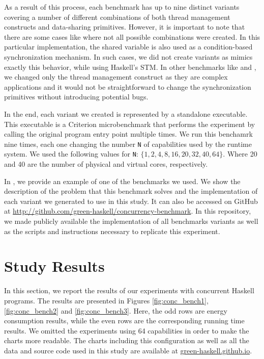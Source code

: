 As a result of this process, each benchmark has up to nine distinct variants covering a number of different combinations of both thread management constructs and data-sharing primitives. However, it is important to note that there are some cases like \dining where not all possible combinations were created. In this particular implementation, the shared variable is also used as a condition-based synchronization mechanism. In such cases, we did not create \TVar variants as \TMVar mimics exactly this behavior, while using Haskell's STM. In other benchmarks like \tsearch and \warp, we changed only the thread management construct as they are complex applications and it would not be straightforward to change the synchronization primitives without introducing potential bugs.

In the end, each variant we created is represented by a standalone executable. This executable is a Criterion microbenchmark that performs the experiment by calling the original program entry point multiple times. We run this benchamrk nine times, each one changing the number \texttt{N} of capabilities used by the runtime system. We used the following values for \texttt{N}: $\{1, 2, 4, 8, 16, 20, 32, 40, 64\}$. Where 20 and 40 are the number of physical and virtual cores, respectively.

In , we provide an example of one of the benchmarks we used. We show the description of the problem that this benchmark solves and the implementation of each variant we generated to use in this study. It can also be accessed on GitHub at \url{http://github.com/green-haskell/concurrency-benchmark}. In this repository, we made publicly available the implementation of all benchmarks variants as well as the scripts and instructions necessary to replicate this experiment.


\section{Study Results}\label{sec:results}
In this section, we report the results of our experiments with concurrent Haskell programs. The results are presented in Figures \ref{fig:conc_bench1}, \ref{fig:conc_bench2} and \ref{fig:conc_bench3}. Here, the odd rows are energy consumption results, while the even rows are the corresponding running time results. We omitted the experiments using 64 capabilities in order to make the charts more readable. The charts including this configuration as well as all the data and source code used in this study are available at \href{http://green-haskell.github.io/}{green-haskell.github.io}.
\newline


